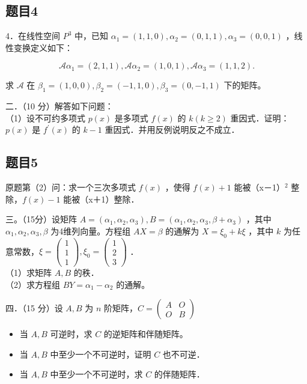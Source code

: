 \documentclass{article}
\begin{document}
\subsection{题目4}
4．在线性空间 \(P^{3}\) 中，已知 \(\alpha_{1}=(1,1,0), \alpha_{2}=(0,1,1), \alpha_{3}=(0,0,1)\) ，线性变换定义如下：

\[
\mathcal{A} \alpha_{1}=(2,1,1), \mathcal{A} \alpha_{2}=(1,0,1), \mathcal{A} \alpha_{3}=(1,1,2) .
\]

求 \(\mathcal{A}\) 在 \(\beta_{1}=(1,0,0), \beta_{2}=(-1,1,0), \beta_{3}=(0,-1,1)\) 下的矩阵。

二．（10 分）解答如下问题：\\
（1）设不可约多项式 \(p(x)\) 是多项式 \(f(x)\) 的 \(k(k \geq 2)\) 重因式．证明：\(p(x)\) 是 \(f^{\prime}(x)\) 的 \(k-1\) 重因式．并用反例说明反之不成立．\\

\subsection{题目5}
原题第（2）问：求一个三次多项式 \(f(x)\) ，使得 \(f(x)+1\) 能被（x－1）\({ }^{2}\) 整除，\(f(x)-1\) 能被（x＋1）整除．

三。（15分）设矩阵 \(A=\left(\alpha_{1}, \alpha_{2}, \alpha_{3}\right), B=\left(\alpha_{1}, \alpha_{2}, \alpha_{3}, \beta+\alpha_{3}\right)\) ，其中 \(\alpha_{1}, \alpha_{2}, \alpha_{3}, \beta\) 为4维列向量。方程组 \(A X=\beta\) 的通解为 \(X=\xi_{0}+k \xi\) ，其中 \(k\) 为任意常数，\(\xi=\left(\begin{array}{l}1 \\ 1 \\ 1\end{array}\right), \xi_{0}=\left(\begin{array}{l}1 \\ 2 \\ 3\end{array}\right)\) ．\\
（1）求矩阵 \(A, B\) 的秩．\\
（2）求方程组 \(B Y=\alpha_{1}-\alpha_{2}\) 的通解。

四．（15 分）设 \(A, B\) 为 \(n\) 阶矩阵，\(C=\left(\begin{array}{cc}A & O \\ O & B\end{array}\right)\)

\begin{itemize}
  \item[（1）] 当 \(A, B\) 可逆时，求 \(C\) 的逆矩阵和伴随矩阵。
  \item[（2）] 当 \(A, B\) 中至少一个不可逆时，证明 \(C\) 也不可逆．
  \item[（3）] 当 \(A, B\) 中至少一个不可逆时，求 \(C\) 的伴随矩阵．
\end{itemize}
\end{document}
